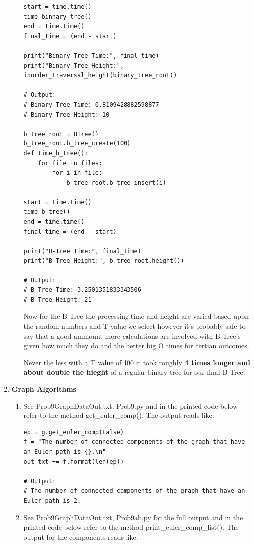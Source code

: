\documentclass{article}
\begin{document}
\begin{enumerate}
\begin{enumerate}
\begin{lstlisting}
start = time.time()
time_binnary_tree()
end = time.time()                   
final_time = (end - start)
    
print("Binary Tree Time:", final_time)  
print("Binary Tree Height:", inorder_traversal_height(binary_tree_root))

# Output:
# Binary Tree Time: 0.8109428882598877
# Binary Tree Height: 10

b_tree_root = BTree()
b_tree_root.b_tree_create(100)
def time_b_tree():
    for file in files:
        for i in file:
            b_tree_root.b_tree_insert(i)

start = time.time()
time_b_tree()
end = time.time()                   
final_time = (end - start)
    
print("B-Tree Time:", final_time)  
print("B-Tree Height:", b_tree_root.height())

# Output:
# B-Tree Time: 3.2501351833343506
# B-Tree Height: 21
    \end{lstlisting}

    Now for the B-Tree the processing time and height are varied based upon the random numbers and T value we select however it's probably safe to say that a good ammount more calculations are involved with B-Tree's given how much they do and the better big O times for certian outcomes.

    Never the less with a T value of 100 it took roughly \textbf{4 times longer and about double the hieght} of a regular binary tree for our final B-Tree.

  \end{enumerate}
  
  \item \textbf{Graph Algorithms}
  
  \begin{enumerate}
    \item See Prob9GraphDataOut.txt, Prob9.py and in the printed code below refer to the method get\_euler\_comp(). The output reads like:
    
    \begin{lstlisting}
ep = g.get_euler_comp(False)
f = "The number of connected components of the graph that have an Euler path is {}.\n"
out_txt += f.format(len(ep))

# Output:
# The number of connected components of the graph that have an Euler path is 2.
    \end{lstlisting}

    \item See Prob9GraphDataOut.txt, Prob9ab.py for the full output and in the printed code below refer to the method print\_euler\_comp\_list(). The output for the components reads like:
    

\end{enumerate}
\end{enumerate}
\end{document}
